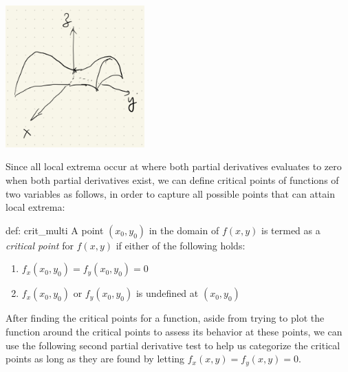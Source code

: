 \begin{center}
    \includegraphics[width = 0.4\textwidth]{figures/chap 08/saddle.png}
\end{center}

Since all local extrema occur at where both partial derivatives evaluates to zero when both partial derivatives exist, we can define critical points of functions of two variables as follows, in order to capture all possible points that can attain local extrema:

\begin{defi}{def: crit_multi}
    A point $(x_0, y_0)$ in the domain of $f(x, y)$ is termed as a \textit{critical point} for $f(x, y)$ if either of the following holds:
    \begin{enumerate}
        \item $f_x(x_0, y_0) = f_y(x_0, y_0) = 0$
        \item $f_x(x_0, y_0)$ or $f_y(x_0, y_0)$ is undefined at $(x_0, y_0)$
    \end{enumerate}
\end{defi}

After finding the critical points for a function, aside from trying to plot the function around the critical points to assess its behavior at these points, we can use the following second partial derivative test to help us categorize the critical points as long as they are found by letting $f_x(x,y) = f_y(x,y) = 0$.

